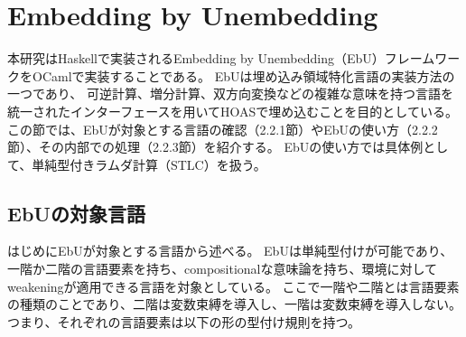 \documentclass[uplatex]{sumiilab-paper}
\theoremstyle{mystyle}
\numberwithin{definition}{chapter} %
\newcommand{\bkeyword}[1]{\ensuremath{\mathbf{#1}}}
\newcommand{\BOOL}{\bkeyword{Bool}}
\newcommand{\TRUE}{\bkeyword{true}}
\begin{document}

\section{Embedding by Unembedding}
本研究はHaskellで実装されるEmbedding by Unembedding\cite{matsuda2023embedding}（EbU）フレームワークをOCamlで実装することである。
EbUは埋め込み領域特化言語の実装方法の一つであり、
可逆計算、増分計算、双方向変換などの複雑な意味を持つ言語を統一されたインターフェースを用いてHOASで埋め込むことを目的としている。
この節では、EbUが対象とする言語の確認（2.2.1節）やEbUの使い方（2.2.2節）、その内部での処理（2.2.3節）を紹介する。
EbUの使い方では具体例として、単純型付きラムダ計算（STLC）を扱う。\\

\subsection{EbUの対象言語}
はじめにEbUが対象とする言語から述べる。
EbUは単純型付けが可能であり、一階か二階の言語要素\cite{fstsnd_fiore}を持ち、compositionalな意味論を持ち、環境に対してweakeningが適用できる言語を対象としている。
ここで一階や二階とは言語要素の種類のことであり、二階は変数束縛を導入し、一階は変数束縛を導入しない。
つまり、それぞれの言語要素は以下の形の型付け規則を持つ。

\begin{prooftree}
\end{prooftree}

\begin{prooftree}
\end{prooftree}
\end{document}
